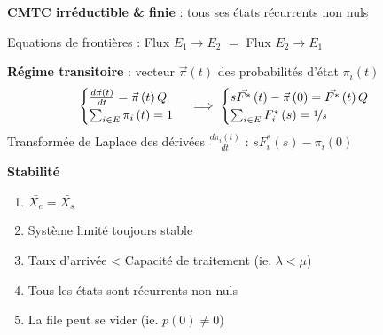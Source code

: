 \documentclass[french]{scrartcl}
\begin{document}
\begin{multicols}{3}
\begin{fleqn}
{\vspace{-7pt}
\textbf{CMTC irréductible \& finie} : tous ses états récurrents non nuls
\vspace{-15pt}
\begin{center}
	\shorthandoff{:}\shorthandoff{!}
\end{center}
\vspace{-10pt}

Equations de frontières : Flux $E_1 \to E_2$ $=$ Flux $E_2 \to E_1$

\textbf{Régime transitoire} : vecteur $\vec{\pi}(t)$ des probabilités d'état $\pi_i(t)$
\[
\begin{cases}
\frac{d\vec{\pi}\left(t\right)}{dt}=\vec{\pi}\left(t\right)Q\\
\sum_{i\in E}\pi_{i}\left(t\right)=1
\end{cases}\implies\begin{cases}
s\vec{F^{*}}\left(t\right)-\vec{\pi}\left(0\right)=\vec{F^{*}}\left(t\right)Q\\
\sum_{i\in E}F_{i}^{*}\left(s\right)=\nicefrac{1}{s}
\end{cases}
\]
Transformée de Laplace des dérivées $\frac{d\pi_i(t)}{dt}$ : $sF_i^*(s)-\pi_i(0)$

\vspace{3pt}
\textbf{Stabilité}
\begin{enumerate}[label=$\iff$]
	\item $\bar{X_e} = \bar{X_s}$
	\item Système limité toujours stable
	\item Taux d'arrivée < Capacité de traitement (ie. $\lambda<\mu$)
	\item Tous les états sont récurrents non nuls
	\item La file peut se vider (ie. $p\left(0\right)\ne0$)
\end{enumerate}

}
\end{fleqn}
\end{multicols}
\end{document}
